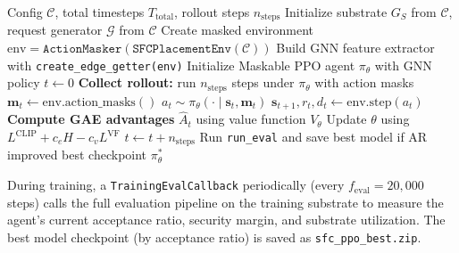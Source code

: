 \begin{algorithm}[!ht]
\caption{Training Procedure for the Intelligent Security Posture Aware DRL Framework (Maskable PPO with GNN)}
\label{alg:training}
\begin{algorithmic}[1]
\Require Config $\mathcal{C}$, total timesteps $T_{\text{total}}$, rollout steps $n_{\text{steps}}$
\State Initialize substrate $G_S$ from $\mathcal{C}$, request generator $\mathcal{G}$ from $\mathcal{C}$
\State Create masked environment $\text{env} = \texttt{ActionMasker}(\texttt{SFCPlacementEnv}(\mathcal{C}))$
\State Build GNN feature extractor with \texttt{create\_edge\_getter(env)}
\State Initialize Maskable PPO agent $\pi_\theta$ with GNN policy
\State $t \leftarrow 0$
  \State \textbf{Collect rollout:} run $n_{\text{steps}}$ steps under $\pi_\theta$ with action masks
    \State $\mathbf{m}_t \leftarrow \text{env.action\_masks}()$
    \State $a_t \sim \pi_\theta(\cdot \mid \mathbf{s}_t, \mathbf{m}_t)$
    \State $\mathbf{s}_{t+1}, r_t, d_t \leftarrow \text{env.step}(a_t)$
  \EndFor
  \State \textbf{Compute GAE advantages} $\hat{A}_t$ using value function $V_\theta$
      \State Update $\theta$ using $L^{\text{CLIP}} + c_e H - c_v L^{\text{VF}}$
    \EndFor
  \EndFor
  \State $t \leftarrow t + n_{\text{steps}}$
    \State Run \texttt{run\_eval} and save best model if AR improved
  \EndIf
\EndWhile
\State \Return best checkpoint $\pi_\theta^*$
\end{algorithmic}
\end{algorithm}

During training, a \texttt{TrainingEvalCallback} periodically (every $f_{\text{eval}} = 20{,}000$ steps) calls the full evaluation pipeline on the training substrate to measure the agent's current acceptance ratio, security margin, and substrate utilization. The best model checkpoint (by acceptance ratio) is saved as \texttt{sfc\_ppo\_best.zip}.
